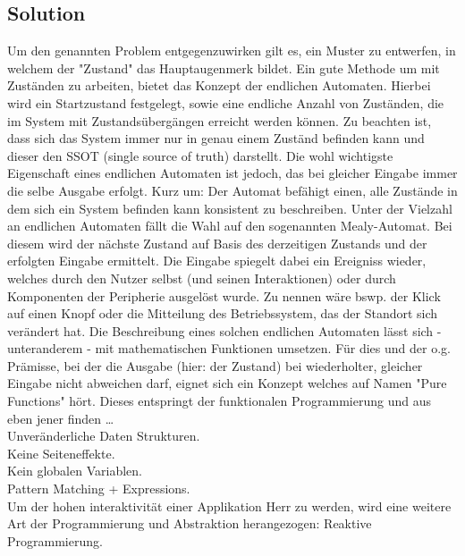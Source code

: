 \subsection{Solution}
\label{subsec:solution}

Um den genannten Problem entgegenzuwirken gilt es, ein Muster zu entwerfen,
in welchem der "Zustand" das Hauptaugenmerk bildet.
Ein gute Methode um mit Zuständen zu arbeiten, bietet das Konzept der endlichen Automaten.
Hierbei wird ein Startzustand festgelegt, sowie eine endliche Anzahl von Zuständen, die im System mit
Zustandsübergängen erreicht werden können. Zu beachten ist, dass sich das System immer nur in genau
einem Zuständ befinden kann und dieser den SSOT (single source of truth) darstellt.
Die wohl wichtigste Eigenschaft eines endlichen Automaten ist jedoch, das bei gleicher Eingabe
immer die selbe Ausgabe erfolgt.
Kurz um: Der Automat befähigt einen, alle Zustände in dem sich ein System befinden kann
konsistent zu beschreiben. 
Unter der Vielzahl an endlichen Automaten fällt die Wahl auf den sogenannten Mealy-Automat.
Bei diesem wird der nächste Zustand auf Basis des derzeitigen Zustands und der erfolgten Eingabe ermittelt.
Die Eingabe spiegelt dabei ein Ereigniss wieder, welches durch den Nutzer selbst (und seinen Interaktionen) 
oder durch Komponenten der Peripherie ausgelöst wurde. Zu nennen wäre bswp. 
der Klick auf einen Knopf oder die Mitteilung des Betriebssystem, das der Standort sich verändert hat.
Die Beschreibung eines solchen endlichen Automaten lässt sich - unteranderem - mit
mathematischen Funktionen umsetzen. Für dies und der o.g. Prämisse, bei der die Ausgabe (hier: der Zustand) bei wiederholter,
gleicher Eingabe nicht abweichen darf, eignet sich ein Konzept welches auf Namen "Pure Functions" hört.
Dieses entspringt der funktionalen Programmierung und aus eben jener finden \dots \\
Unveränderliche Daten Strukturen. \\
Keine Seiteneffekte. \\
Kein globalen Variablen. \\
Pattern Matching + Expressions. \\
Um der hohen interaktivität einer Applikation Herr zu werden, wird eine weitere Art der Programmierung und
Abstraktion herangezogen: Reaktive Programmierung.


